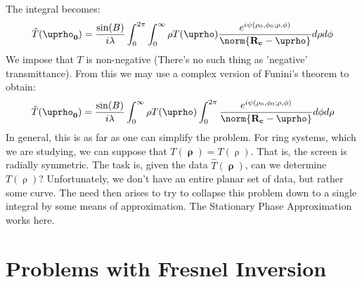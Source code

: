 \documentclass[crop=false,class=book,oneside]{standalone}
\begin{document}
            The integral becomes:
            \begin{equation}
                \hat{T}(\boldsymbol{\uprho_{0}})
                =\frac{\sin(B)}{i\lambda}
                 \int_{0}^{2\pi}\int_{0}^{\infty}\rho
                 T(\boldsymbol{\uprho})
                 \frac{%
                    e^{i\psi(\rho_{0},\phi_{0};\rho,\phi)}
                }{%
                    \norm{\mathbf{R_{c}}-\boldsymbol{\uprho}}
                }d\rho{d}\phi    
            \end{equation}
            We impose that $T$ is non-negative
            (There's no such thing as 'negative' transmittance).
            From this we may use a complex version of Funini's
            theorem to obtain:
            \begin{equation}
                \hat{T}(\boldsymbol{\uprho_{0}})
                =\frac{\sin(B)}{i\lambda}\int_{0}^{\infty}\rho T(\boldsymbol{\uprho})\int_{0}^{2\pi}\frac{e^{i\psi(\rho_{0},\phi_{0};\rho,\phi)}}{\norm{\mathbf{R_{c}}-\boldsymbol{\uprho}}}d\phi d\rho
            \end{equation}
                In general, this is as far as one can simplify the problem. For ring systems, which we are studying, we can suppose that $T(\boldsymbol{\uprho})=T(\uprho)$. That is, the screen is radially symmetric. The task is, given the data $\hat{T}(\boldsymbol{\uprho})$, can we determine $T(\uprho)$? Unfortunately, we don't have an entire planar set of data, but rather some curve. The need then arises to try to collapse this problem down to a single integral by some means of approximation. The Stationary Phase Approximation works here.
    \section{Problems with Fresnel Inversion}
\end{document}
